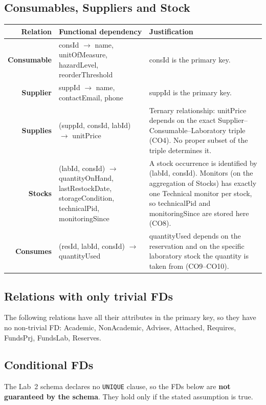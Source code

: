 \documentclass[11pt,a4paper]{article}
\newcommand{\fd}{\ensuremath{\rightarrow}}
\newcommand{\rel}[1]{\textbf{#1}}
\begin{document}
\subsection{Consumables, Suppliers and Stock}
\begin{longtable}{R F J}
\toprule
\textbf{Relation} & \textbf{Functional dependency} & \textbf{Justification}\\
\midrule
\endhead
\rel{Consumable} & consId \fd{} name, unitOfMeasure, hazardLevel, reorderThreshold & consId is the primary key.\\
\rel{Supplier} & suppId \fd{} name, contactEmail, phone & suppId is the primary key.\\
\rel{Supplies} & (suppId, consId, labId) \fd{} unitPrice & Ternary relationship: unitPrice depends on the exact Supplier--Consumable--Laboratory triple (CO4). No proper subset of the triple determines it.\\
\rel{Stocks} & (labId, consId) \fd{} quantityOnHand, lastRestockDate, storageCondition, technicalPid, monitoringSince & A stock occurrence is identified by (labId, consId). Monitors (on the aggregation of Stocks) has exactly one Technical monitor per stock, so technicalPid and monitoringSince are stored here (CO8).\\
\rel{Consumes} & (resId, labId, consId) \fd{} quantityUsed & quantityUsed depends on the reservation and on the specific laboratory stock the quantity is taken from (CO9--CO10).\\
\bottomrule
\end{longtable}

\subsection{Relations with only trivial FDs}
The following relations have all their attributes in the primary key, so they have no non-trivial FD: Academic, NonAcademic, Advises, Attached, Requires, FundsPrj, FundsLab, Reserves.

\subsection{Conditional FDs}
The Lab~2 schema declares no \texttt{UNIQUE} clause, so the FDs below are \textbf{not guaranteed by the schema}. They hold only if the stated assumption is true.
\end{document}
